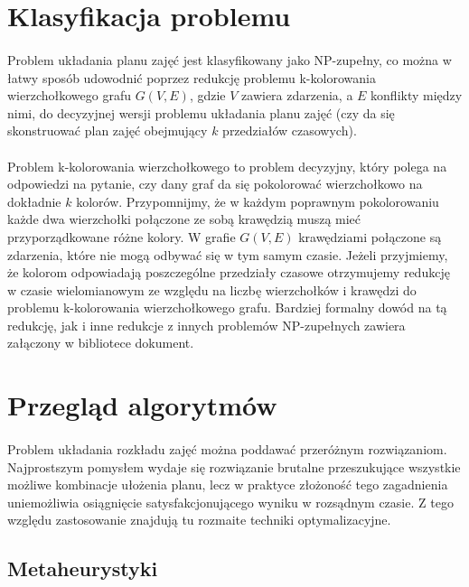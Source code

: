 \section{Klasyfikacja problemu}
\paragraph{}Problem układania planu zajęć jest klasyfikowany jako NP-zupełny, co można w łatwy sposób udowodnić poprzez redukcję problemu k-kolorowania wierzchołkowego grafu $G(V, E)$, gdzie $V$ zawiera zdarzenia, a $E$ konflikty między nimi, do decyzyjnej wersji problemu układania planu zajęć (czy da się skonstruować plan zajęć obejmujący $k$ przedziałów czasowych).
\paragraph{}Problem k-kolorowania wierzchołkowego to problem decyzyjny, który polega na odpowiedzi na pytanie, czy dany graf da się pokolorować wierzchołkowo na dokładnie $k$ kolorów. Przypomnijmy, że w każdym poprawnym pokolorowaniu każde dwa wierzchołki połączone ze sobą krawędzią muszą mieć przyporządkowane różne kolory. W grafie $G(V,E)$ krawędziami połączone są zdarzenia, które nie mogą odbywać się w tym samym czasie. Jeżeli przyjmiemy, że kolorom odpowiadają poszczególne przedziały czasowe otrzymujemy redukcję w czasie wielomianowym ze względu na liczbę wierzchołków i krawędzi do problemu k-kolorowania wierzchołkowego grafu. Bardziej formalny dowód na tą redukcję, jak i inne redukcje z innych problemów NP-zupełnych zawiera załączony w bibliotece dokument\cite{npcomplete}.

\section{Przegląd algorytmów}
\paragraph{}Problem układania rozkładu zajęć można poddawać przeróżnym rozwiązaniom. Najprostszym pomysłem wydaje się rozwiązanie brutalne przeszukujące wszystkie możliwe kombinacje ułożenia planu, lecz w praktyce złożoność tego zagadnienia uniemożliwia osiągnięcie satysfakcjonującego wyniku w rozsądnym czasie. Z tego względu zastosowanie znajdują tu rozmaite techniki optymalizacyjne.
\subsection{Metaheurystyki}
